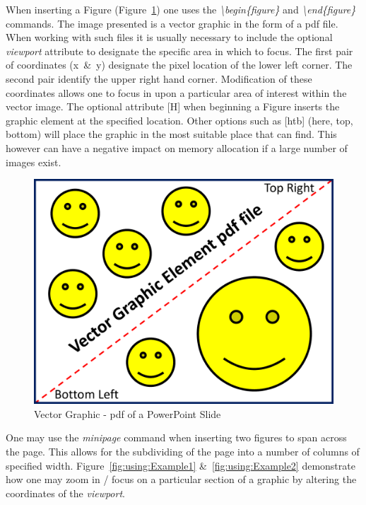 When inserting a Figure (Figure~\ref{fig:using:VectorGraphicElementPDF}) one uses the \emph{\textbackslash begin\{figure\}} and \emph{\textbackslash end\{figure\}} commands. The image presented is a vector graphic in the form of a pdf file. When working with such files it is usually necessary to include the optional \emph{viewport} attribute to designate the specific area in which to focus. The first pair of coordinates (x~\&~y) designate the pixel location of the lower left corner. The second pair identify the upper right hand corner. Modification of these coordinates allows one to focus in upon a particular area of interest within the vector image. The optional attribute [H] when beginning a Figure inserts the graphic element at the specified location. Other options such as [htb] (here, top, bottom) will place the graphic in the most suitable place that \latex can find. This however can have a negative impact on memory allocation if a large number of images exist.


\begin{figure}[H]
\centering
\includegraphics[width=.4\linewidth]{resources/VectorGraphicElementPDF.pdf}
\caption{Vector Graphic - pdf of a PowerPoint Slide}
\label{fig:using:VectorGraphicElementPDF}
\end{figure}

One may use the \emph{minipage} command when inserting two figures to span across the page. This allows for the subdividing of the page into a number of columns of specified width. Figure~\ref{fig:using:Example1} \&~\ref{fig:using:Example2} demonstrate how one may zoom in / focus on a particular section of a graphic by altering the coordinates of the \emph{viewport}. 

